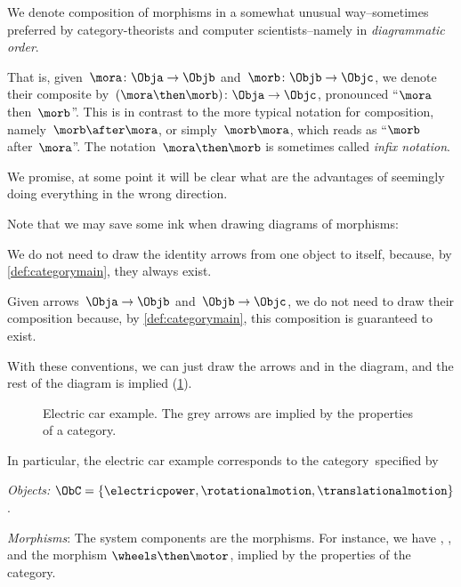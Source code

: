 
\begin{remark}
  We denote composition of morphisms in a somewhat unusual way--sometimes preferred by category-theorists and computer scientists--namely in \emph{diagrammatic order}.

  That is, given~$\mora \colon \Obja\to \Objb$ and~$\morb \colon \Objb \to \Objc$, we denote their composite by~$(\mora\then \morb)\colon \Obja\to \Objc$, pronounced ``$\mora$ then~$\morb$''. This is in contrast to the more typical notation for composition, namely~$\morb\after \mora$, or simply~$\morb \mora$, which reads as ``$\morb$ after~$\mora$''. The notation~$\mora \then \morb$ is sometimes called \emph{infix notation}.

  We promise, at some point it will be clear what are the advantages of seemingly doing everything
  in the wrong direction.
\end{remark}

Note that we may save some ink when drawing diagrams of morphisms:
\begin{compactitem}
  \item We do not need to draw the identity arrows from one object to itself, because, by \cref{def:categorymain}, they always exist.
  \item  Given arrows~$\Obja \to \Objb$ and~$\Objb \to \Objc$, we do not need to draw their composition because, by \cref{def:categorymain}, this composition is guaranteed to exist.
\end{compactitem}

With these conventions, we can just draw the arrows \motor and \wheels in the diagram, and the rest of the diagram is implied (\cref{fig:e5}).

\begin{figure}[h!]
  \centering
  \caption{Electric car example. The grey arrows are implied by the properties
  of a category.\label{fig:e5}}
\end{figure}

In particular, the electric car example corresponds to the category~\CatC specified by
\begin{compactitem}
  \item \emph{Objects:} $\ObC=\{\electricpower,\rotationalmotion,\translationalmotion\}$.
  \item \emph{Morphisms}: The system components are the morphisms. For instance, we have \motor, \wheels, and the morphism $\wheels \then \motor$, implied by the properties of the category.
\end{compactitem}

